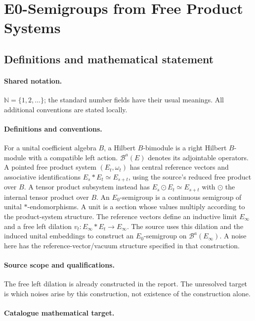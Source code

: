\documentclass[11pt]{article}
\begin{document}
\section{E0-Semigroups from Free Product Systems}\label{statement}

\subsection{Definitions and mathematical statement}

\paragraph{Shared notation.}$\mathbb N=\{1,2,\ldots\}$; the standard number fields have their usual meanings. All additional conventions are stated locally.


\paragraph{Definitions and conventions.} For a unital coefficient algebra $B$, a Hilbert $B$-bimodule is a right Hilbert $B$-module with a compatible left action. $\mathcal B^a(E)$ denotes its adjointable operators. A pointed free product system $(E_t,\omega_t)$ has central reference vectors and associative identifications $E_s*E_t\simeq E_{s+t}$, using the source's reduced free product over $B$. A tensor product subsystem instead has $E_s\odot E_t\simeq E_{s+t}$ with $\odot$ the internal tensor product over $B$. An $E_0$-semigroup is a continuous semigroup of unital $*$-endomorphisms. A unit is a section whose values multiply according to the product-system structure. The reference vectors define an inductive limit $E_\infty$ and a free left dilation $v_t:E_\infty*E_t\to E_\infty$. The source uses this dilation and the induced unital embeddings to construct an $E_0$-semigroup on $\mathcal B^a(E_\infty)$. A noise here has the reference-vector/vacuum structure specified in that construction.

\paragraph{Source scope and qualifications.} The free left dilation is already constructed in the report. The unresolved target is which noises arise by this construction, not existence of the construction alone.

\paragraph{Catalogue mathematical target.}
\end{document}
